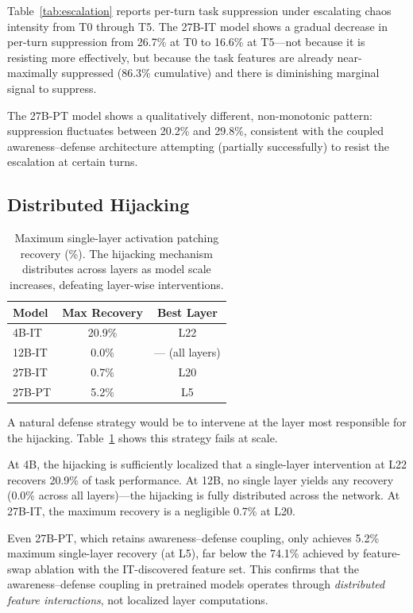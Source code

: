 \documentclass[10pt,twocolumn]{article}
\begin{document}
Table~\ref{tab:escalation} reports per-turn task suppression under escalating chaos intensity from T0 through T5.
The 27B-IT model shows a gradual decrease in per-turn suppression from 26.7\% at T0 to 16.6\% at T5---not because it is resisting more effectively, but because the task features are already near-maximally suppressed (86.3\% cumulative) and there is diminishing marginal signal to suppress.

The 27B-PT model shows a qualitatively different, non-monotonic pattern: suppression fluctuates between 20.2\% and 29.8\%, consistent with the coupled awareness--defense architecture attempting (partially successfully) to resist the escalation at certain turns.

\subsection{Distributed Hijacking}
\label{sec:distributed}

\begin{table}[t]
\centering
\caption{Maximum single-layer activation patching recovery (\%). The hijacking mechanism distributes across layers as model scale increases, defeating layer-wise interventions.}
\label{tab:distributed}
\small
\begin{tabular}{@{}lcc@{}}
\toprule
\textbf{Model} & \textbf{Max Recovery} & \textbf{Best Layer} \\
\midrule
4B-IT  & 20.9\% & L22 \\
12B-IT & 0.0\%  & --- (all layers) \\
27B-IT & 0.7\%  & L20 \\
27B-PT & 5.2\%  & L5 \\
\bottomrule
\end{tabular}
\end{table}

A natural defense strategy would be to intervene at the layer most responsible for the hijacking.
Table~\ref{tab:distributed} shows this strategy fails at scale.

At 4B, the hijacking is sufficiently localized that a single-layer intervention at L22 recovers 20.9\% of task performance.
At 12B, no single layer yields any recovery (0.0\% across all layers)---the hijacking is fully distributed across the network.
At 27B-IT, the maximum recovery is a negligible 0.7\% at L20.

Even 27B-PT, which retains awareness--defense coupling, only achieves 5.2\% maximum single-layer recovery (at L5), far below the 74.1\% achieved by feature-swap ablation with the IT-discovered feature set.
This confirms that the awareness--defense coupling in pretrained models operates through \emph{distributed feature interactions}, not localized layer computations.
\end{document}
